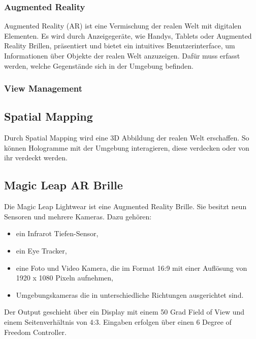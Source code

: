 \documentclass[german,a4paper, 12pt]{llncs}
\begin{document}
\subsubsection{Augmented Reality} %
Augmented Reality (AR) ist eine Vermischung der realen Welt mit digitalen Elementen. Es wird durch Anzeigegeräte, wie Handys, Tablets oder Augmented Reality Brillen, präsentiert und bietet ein intuitives Benutzerinterface, um Informationen über Objekte der realen Welt anzuzeigen. Dafür muss erfasst werden, welche Gegenstände sich in der Umgebung befinden. %

\subsubsection{View Management}

\subsection{Spatial Mapping} 
Durch Spatial Mapping wird eine 3D Abbildung der realen Welt erschaffen. So können Hologramme mit der Umgebung interagieren, diese verdecken oder von ihr verdeckt werden.\cite{spatialMapping} 

\subsection{Magic Leap AR Brille}

Die Magic Leap Lightwear ist eine Augmented Reality Brille. Sie besitzt neun Sensoren und mehrere Kameras. Dazu gehören:
\begin{itemize}
	\item ein Infrarot Tiefen-Sensor,
	\item ein Eye Tracker,
	\item eine Foto und Video Kamera, die im Format 16:9 mit einer Auflösung von 1920 x 1080 Pixeln aufnehmen,
	\item Umgebungskameras die in unterschiedliche Richtungen ausgerichtet sind. \cite{mlofficialsalespitch,mlglossary}
\end{itemize}

Der Output geschieht über ein Display mit einem 50 Grad Field of View und einem Seitenverhältnis von 4:3. 
Eingaben erfolgen über einen 6 Degree of Freedom Controller.\cite{mlofficialsalespitch,mlglossary}
\end{document}
